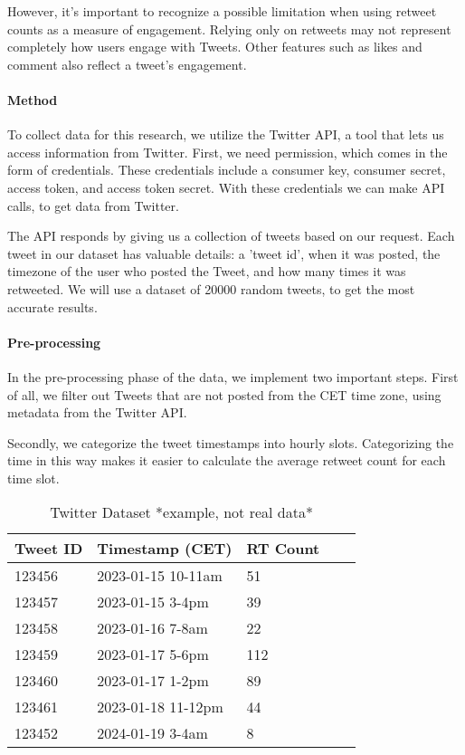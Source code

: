 \documentclass[11pt]{article}
\begin{document}
However, it's important to recognize a possible limitation when using retweet counts as a measure of engagement. Relying only on retweets may not represent completely how users engage with Tweets. Other features such as likes and comment also reflect a tweet's engagement.

\paragraph{Method}
To collect data for this research, we utilize the Twitter API, a tool that lets us access information from Twitter. First, we need permission, which comes in the form of credentials. These credentials include a consumer key, consumer secret, access token, and access token secret. With these credentials we can make API calls, to get data from Twitter.

The API responds by giving us a collection of tweets based on our request. Each tweet in our dataset has valuable details: a 'tweet id', when it was posted, the timezone of the user who posted the Tweet, and how many times it was retweeted. We will use a dataset of 20000 random tweets, to get the most accurate results.

\paragraph{Pre-processing} In the pre-processing phase of the data, we implement two important steps. First of all, we filter out Tweets that are not posted from the CET time zone, using metadata from the Twitter API. 

Secondly, we categorize the tweet timestamps into hourly slots. Categorizing the time in this way makes it easier to calculate the average retweet count for each time slot.

\begin{table}[h]
  \centering
  \begin{tabular}{p{1.5cm}p{4cm}p{3cm}p{2cm}p{2cm}}
    \toprule
    Tweet ID & Timestamp (CET) & RT Count \\
    \midrule
    123456 & 2023-01-15 10-11am & 51 \\
    123457 & 2023-01-15 3-4pm & 39 \\
    123458 & 2023-01-16 7-8am & 22 \\
    123459 & 2023-01-17 5-6pm & 112 \\
    123460 & 2023-01-17 1-2pm & 89 \\
    123461 & 2023-01-18 11-12pm & 44 \\
    123452 & 2024-01-19 3-4am & 8 \\
    
    \bottomrule
  \end{tabular}
  \caption{Twitter Dataset *example, not real data*}
  \label{tab:example}
\end{table}
\end{document}

